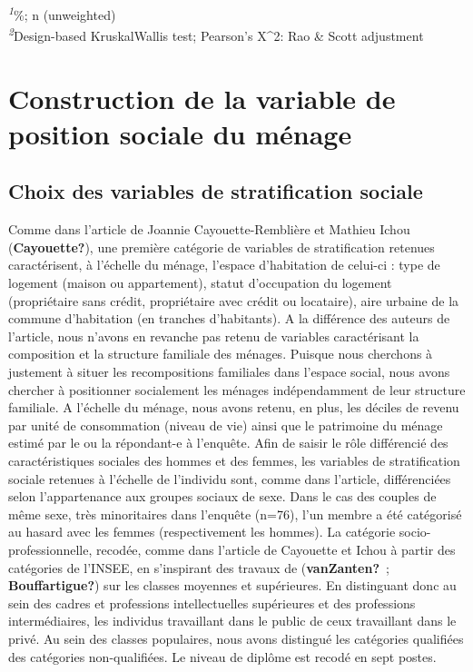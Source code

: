 \documentclass[
  12pt,
]{book}
\begin{document}
\begin{minipage}{\linewidth}
\textsuperscript{\textit{1}}\%; n (unweighted)\\
\textsuperscript{\textit{2}}Design-based KruskalWallis test; Pearson's X\^{}2: Rao \& Scott adjustment\\
\end{minipage}
\endgroup

\section{Construction de la variable de position sociale du
ménage}\label{construction-de-la-variable-de-position-sociale-du-muxe9nage}

\subsection{Choix des variables de stratification
sociale}\label{choix-des-variables-de-stratification-sociale}

Comme dans l'article de Joannie Cayouette-Remblière et Mathieu Ichou
(\textbf{Cayouette?}), une première catégorie de variables de
stratification retenues caractérisent, à l'échelle du ménage, l'espace
d'habitation de celui-ci : type de logement (maison ou appartement),
statut d'occupation du logement (propriétaire sans crédit, propriétaire
avec crédit ou locataire), aire urbaine de la commune d'habitation (en
tranches d'habitants). A la différence des auteurs de l'article, nous
n'avons en revanche pas retenu de variables caractérisant la composition
et la structure familiale des ménages. Puisque nous cherchons à
justement à situer les recompositions familiales dans l'espace social,
nous avons chercher à positionner socialement les ménages indépendamment
de leur structure familiale. A l'échelle du ménage, nous avons retenu,
en plus, les déciles de revenu par unité de consommation (niveau de vie)
ainsi que le patrimoine du ménage estimé par le ou la répondant-e à
l'enquête. Afin de saisir le rôle différencié des caractéristiques
sociales des hommes et des femmes, les variables de stratification
sociale retenues à l'échelle de l'individu sont, comme dans l'article,
différenciées selon l'appartenance aux groupes sociaux de sexe. Dans le
cas des couples de même sexe, très minoritaires dans l'enquête (n=76),
l'un membre a été catégorisé au hasard avec les femmes (respectivement
les hommes). La catégorie socio-professionnelle, recodée, comme dans
l'article de Cayouette et Ichou à partir des catégories de l'INSEE, en
s'inspirant des travaux de (\textbf{vanZanten?}~;
\textbf{Bouffartigue?}) sur les classes moyennes et supérieures. En
distinguant donc au sein des cadres et professions intellectuelles
supérieures et des professions intermédiaires, les individus travaillant
dans le public de ceux travaillant dans le privé. Au sein des classes
populaires, nous avons distingué les catégories qualifiées des
catégories non-qualifiées. Le niveau de diplôme est recodé en sept
postes.
\end{document}
